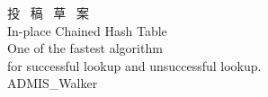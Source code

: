 \begin{titlepage}


\vspace*{120truept}
\begin{center}
  \huge{投 \ 稿 \ 草 \ 案}\\
  \vspace{30truept}
  \huge{In-place Chained Hash Table}\\ %
  \large{One of the fastest algorithm\\for successful lookup and unsuccessful lookup.}\\ %
\vspace{100truept}
\leavevmode \newline %
\leavevmode \newline %
\LARGE{ADMIS\_Walker}\\ %
\end{center}


\end{titlepage}
